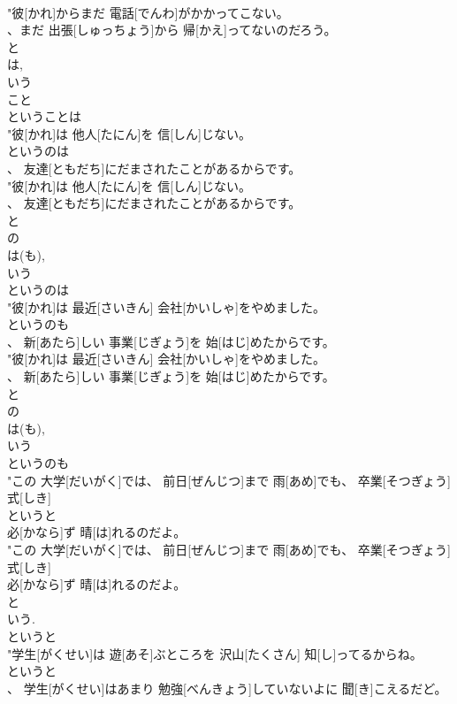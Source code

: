 \documentclass[8pt]{extreport}
\begin{document}
\begin{CJK}{UTF8}{min}
\\	"彼[かれ]からまだ 電話[でんわ]がかかってこない。
\\	、まだ 出張[しゅっちょう]から 帰[かえ]ってないのだろう。
\\	と 
\\	は, 
\\	いう 
\\	こと	
\\	ということは
\\	"彼[かれ]は 他人[たにん]を 信[しん]じない。
\\	というのは
\\	、 友達[ともだち]にだまされたことがあるからです。
\\	"彼[かれ]は 他人[たにん]を 信[しん]じない。
\\	、 友達[ともだち]にだまされたことがあるからです。
\\	と 
\\	の 
\\	は(も), 
\\	いう	
\\	というのは
\\	"彼[かれ]は 最近[さいきん] 会社[かいしゃ]をやめました。
\\	というのも
\\	、 新[あたら]しい 事業[じぎょう]を 始[はじ]めたからです。
\\	"彼[かれ]は 最近[さいきん] 会社[かいしゃ]をやめました。
\\	、 新[あたら]しい 事業[じぎょう]を 始[はじ]めたからです。
\\	と 
\\	の 
\\	は(も), 
\\	いう	
\\	というのも
\\	"この 大学[だいがく]では、 前日[ぜんじつ]まで 雨[あめ]でも、 卒業[そつぎょう] 式[しき]
\\	というと
\\	必[かなら]ず 晴[は]れるのだよ。
\\	"この 大学[だいがく]では、 前日[ぜんじつ]まで 雨[あめ]でも、 卒業[そつぎょう] 式[しき]
\\	必[かなら]ず 晴[は]れるのだよ。
\\	と 
\\	いう. 
\\	というと
\\	"学生[がくせい]は 遊[あそ]ぶところを 沢山[たくさん] 知[し]ってるからね。
\\	というと
\\	、 学生[がくせい]はあまり 勉強[べんきょう]していないよに 聞[き]こえるだど。

\end{CJK}
\end{document}
